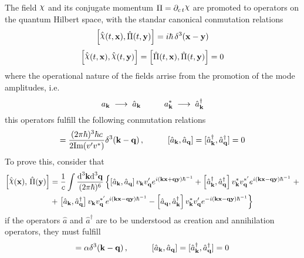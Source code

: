 \documentclass[pt=11, openany,twoside,a4paper]{scrbook}
\DeclareRobustCommand{\rchi}{{\mathpalette\irchi\relax}}
\newcommand{\irchi}[2]{\raisebox{\depth}{$#1\chi$}} %
\begin{document}
	
	The field $\rchi$ and its conjugate momentum $\Pi=\partial_{c\,t} \rchi$ are promoted to operators on the quantum Hilbert space, with the standar canonical conmutation relations
	\begin{equation}
		\left[\hat{\rchi}(t,\mathbf{x}),\hat{\Pi}(t,\mathbf{y})\right]=i\hbar \,\delta^3(\mathbf{x}-\mathbf{y})
	\end{equation}
	\begin{equation}
		\Big[\hat{\rchi}(t,\mathbf{x}),\hat{\rchi}(t,\mathbf{y})\Big]=\left[\hat{\Pi}(t,\mathbf{x}),\hat{\Pi}(t,\mathbf{y})\right]=0
	\end{equation}
	where the operational nature of the fields arrise from the promotion of the mode amplitudes, i.e.
	\begin{equation}
		a_\mathbf{k}\;\longrightarrow\;\hat{a}_\mathbf{k}\hspace{1.0cm}a_\mathbf{k}^*\;\longrightarrow\;\hat{a}_\mathbf{k}^\dagger
	\end{equation}
	this operators fulfill the following conmutation relations
	\begin{equation}
		[\hat{a}_\mathbf{k},\hat{a}_\mathbf{q}^\dagger]=\frac{(2\pi\hbar)^3\hbar c}{2\text{Im}(v'v^*)}\delta^3(\mathbf{k}-\mathbf{q})\,,\hspace{1.0cm}[\hat{a}_\mathbf{k},\hat{a}_\mathbf{q}]=[\hat{a}_\mathbf{k}^\dagger,\hat{a}_\mathbf{q}^\dagger]=0
	\end{equation}
	To prove this, consider that
	\begin{multline}
		\left[\hat{\rchi}(\mathbf{x}),\,\hat{\Pi}(\mathbf{y})\right]=\frac{1}{c}\int\frac{\td^3\mathbf{k}\td^3\mathbf{q}}{(2\pi\hbar)^6}\left\{\left[\hat{a}_\mathbf{k},\hat{a}_\mathbf{q}\right]v_\mathbf{k}v'_\mathbf{q}e^{i\left(\mathbf{kx}+\mathbf{qy}\right)\hbar^{-1}}+\left[\hat{a}_\mathbf{k}^\dagger, \hat{a}_\mathbf{q}^\dagger\right]v_\mathbf{k}^*v_\mathbf{q}^{*'}e^{i(\mathbf{kx}-\mathbf{qy})\hbar^{-1}}\right.+\\
		+\left.\left[\hat{a}_\mathbf{k},\hat{a}_\mathbf{q}^\dagger\right] v_\mathbf{k}v^{*'}_\mathbf{q}e^{i(\mathbf{kx}-\mathbf{qy})\hbar^{-1}}-\left[\hat{a}_\mathbf{q},\hat{a}_\mathbf{k}^\dagger\right]v^*_\mathbf{k}v_\mathbf{q}'e^{-i(\mathbf{kx}-\mathbf{qy})\hbar^{-1}}\right\}
	\end{multline}
	if the operators $\hat{a}$ and $\hat{a}^\dagger$ are to be understood as creation and annihilation operators, they must fulfill
	\begin{equation}
		[\hat{a}_\mathbf{k},\hat{a}_\mathbf{q}^\dagger]=\alpha\delta^3(\mathbf{k}-\mathbf{q})\,,\hspace{1.0cm}[\hat{a}_\mathbf{k},\hat{a}_\mathbf{q}]=[\hat{a}_\mathbf{k}^\dagger,\hat{a}_\mathbf{q}^\dagger]=0
	\end{equation}
\end{document}
